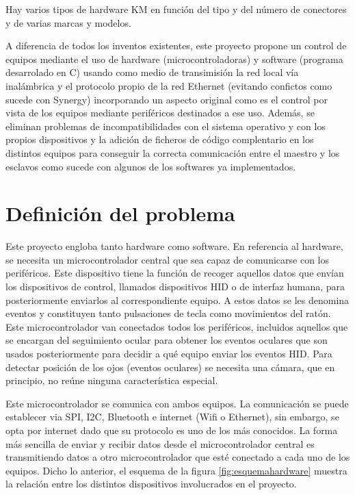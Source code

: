 Hay varios tipos de hardware KM en función del tipo y del número de conectores y de varias marcas y modelos.

A diferencia de todos los inventos existentes, este proyecto propone un control de equipos mediante el uso de hardware (microcontroladoras) y software (programa desarrolado en C) usando como medio de transimisión la red local vía inalámbrica y el protocolo propio de la red Ethernet (evitando confictos como sucede con Synergy) incorporando un aspecto original como es el control por vista de los equipos mediante periféricos destinados a ese uso. Además, se eliminan problemas de incompatibilidades con el sistema operativo y con los propios dispositivos y la adición de ficheros de código complentario en los distintos equipos para conseguir la correcta comunicación entre el maestro y los esclavos como sucede con algunos de los softwares ya implementados.

\section{Definición del problema} \label{s1_3}

Este proyecto engloba tanto hardware como software. En referencia al hardware, se necesita un microcontrolador central que sea capaz de comunicarse con los periféricos. Este dispositivo tiene la función de recoger aquellos datos que envían los dispositivos de control, llamados dispositivos HID o de interfaz humana, para posteriormente enviarlos al correspondiente equipo. A estos datos se les denomina eventos y constituyen tanto pulsaciones de tecla como movimientos del ratón. Este microcontrolador van conectados todos los periféricos, incluidos aquellos que se encargan del seguimiento ocular para obtener los eventos oculares que son usados posteriormente para decidir a qué equipo enviar los eventos HID. Para detectar posición de los ojos (eventos oculares) se necesita una cámara, que en principio, no reúne ninguna característica especial.

Este microcontrolador se comunica con ambos equipos. La comunicación se puede establecer via SPI, I2C, Bluetooth e internet (Wifi o Ethernet), sin embargo, se opta por internet dado que su protocolo es uno de los más conocidos. La forma más sencilla de enviar y recibir datos desde el microcontrolador central es transmitiendo datos a otro microcontrolador que esté conectado a cada uno de los equipos. Dicho lo anterior, el esquema de la figura \ref{fig:esquemahardware} muestra la relación entre los distintos dispositivos involucrados en el proyecto.

